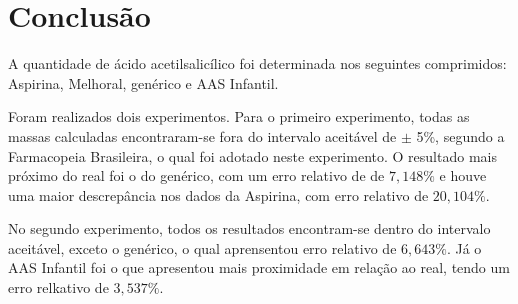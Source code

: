 \chapter{Conclusão}

A quantidade de ácido acetilsalicílico foi determinada nos seguintes comprimidos: Aspirina\R, 
Melhoral\R, genérico e AAS Infantil.

Foram realizados dois experimentos. Para o primeiro experimento, todas as massas calculadas
encontraram-se fora do intervalo aceitável de $\pm$ 5\%, segundo a Farmacopeia Brasileira, o qual
foi adotado neste experimento. O resultado mais próximo do real foi o do genérico, com um erro
relativo de de $7,148\%$ e houve uma maior descrepância nos dados da Aspirina\R, com erro relativo
de $20,104\%$.

No segundo experimento, todos os resultados encontram-se dentro do intervalo aceitável, exceto o
genérico, o qual aprensentou erro relativo de $6,643\%$. Já o AAS Infantil foi o que apresentou mais
proximidade em relação ao real, tendo um erro relkativo de $3,537\%$.
